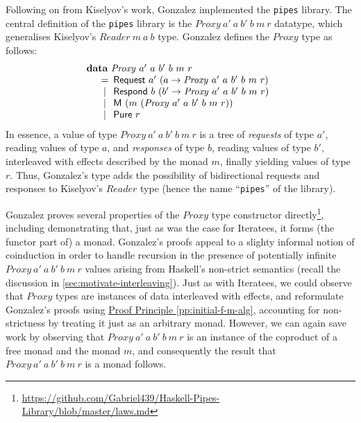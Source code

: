 \documentclass{jfp1}
\newcommand{\proofprinref}[1]{\hyperref[#1]{Proof Principle \ref*{#1}}}
\newcommand{\kw}[1]{\textbf{#1}}
\begin{document}
Following on from Kiselyov's work, Gonzalez implemented the
\texttt{pipes} library. The central definition of the \texttt{pipes}
library is the $\mathit{Proxy}~a'~a~b'~b~m~r$ datatype, which
generalises Kiselyov's $\mathit{Reader}~m~a~b$ type. Gonzalez defines
the $\mathit{Proxy}$ type as follows:
\begin{displaymath}
  \begin{array}{l}
    \kw{data}~\mathit{Proxy}~a'~a~b'~b~m~r \\
    \quad\begin{array}[t]{c@{\hspace{0.5em}}l}
      = & \mathsf{Request}~a'~(a \to \mathit{Proxy}~a'~a~b'~b~m~r) \\
      | & \mathsf{Respond}~b~(b' \to \mathit{Proxy}~a'~a~b'~b~m~r) \\
      | & \mathsf{M}~(m~(\mathit{Proxy}~a'~a~b'~b~m~r)) \\
      | & \mathsf{Pure}~r
    \end{array}
  \end{array}
\end{displaymath}
In essence, a value of type $\mathit{Proxy}~a'~a~b'~b~m~r$ is a tree
of \emph{requests} of type $a'$, reading values of type $a$, and
\emph{responses} of type $b$, reading values of type $b'$, interleaved
with effects described by the monad $m$, finally yielding values of
type $r$. Thus, Gonzalez's type adds the possibility of bidirectional
requests and responses to Kiselyov's $\mathit{Reader}$ type (hence the
name ``\texttt{pipes}'' of the library).

Gonzalez proves several properties of the $\mathit{Proxy}$ type
constructor
directly\footnote{\url{https://github.com/Gabriel439/Haskell-Pipes-Library/blob/master/laws.md}},
including demonstrating that, just as was the case for Iteratees, it
forms (the functor part of) a monad. Gonzalez's proofs appeal to a
slighty informal notion of coinduction in order to handle recursion in
the presence of potentially infinite $\mathit{Proxy}~a'~a~b'~b~m~r$
values arising from Haskell's non-strict semantics (recall the
discussion in \autoref{sec:motivate-interleaving}). Just as with
Iteratees, we could observe that $\mathit{Proxy}$ types are instances
of data interleaved with effects, and reformulate Gonzalez's proofs
using \proofprinref{pp:initial-f-m-alg}, accounting for non-strictness
by treating it just as an arbitrary monad. However, we can again save
work by observing that $\mathit{Proxy}~a'~a~b'~b~m~r$ is an instance
of the coproduct of a free monad and the monad $m$, and consequently
the result that $\mathit{Proxy}~a'~a~b'~b~m~r$ is a monad follows.
\end{document}
